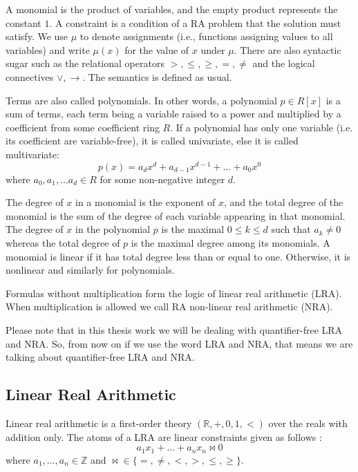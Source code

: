 \noindent A monomial is the product of variables, and the empty product represents the constant $1$. 
A constraint is a condition of a RA problem that the solution must satisfy.
We use $\mu$ to denote assignments (i.e., functions assigning values to all variables) and write $\mu (x)$ for the value of $x$ under $\mu$.
There are also syntactic sugar such as the relational operators $>, \leq, \geq, =, \neq$ and the logical connectives $\vee, \to$.
The semantics is defined as usual.\newline

\noindent Terms are also called polynomials.
In other words, a polynomial $p\in R[x]$ is a sum of terms, each term being a variable raised to a power and multiplied by a coefficient from some coefficient ring $R$.
If a polynomial has only one variable (i.e. its coefficient are variable-free), it is called univariate, else it is called multivariate: 
$$ p(x) = a_{d}x^{d} + a_{d-1}x^{d-1} + \ldots + a_{0}x^{0} $$
where $a_{0}, a_{1}, \ldots a_{d} \in R$ for some non-negative integer $d$.\newline

\noindent The degree of $x$ in a monomial is the exponent of $x$, and the total degree of the monomial is the sum of the degree of each variable appearing in that monomial.
The degree of $x$ in the polynomial $p$ is the maximal $0\leq k\leq d$ such that $a_{k}\neq 0$ whereas the total degree of $p$ is the maximal degree among its monomials.\newline
A monomial is linear if it has total degree less than or equal to one. 
Otherwise, it is nonlinear and similarly for polynomials.\newline

\noindent Formulas without multiplication form the logic of linear real arithmetic (LRA).
When multiplication is allowed we call RA non-linear real arithmetic (NRA).\newline

\noindent Please note that in this thesis work we will be dealing with quantifier-free LRA and NRA.
So, from now on if we use the word LRA and NRA, that means we are talking about quantifier-free LRA and NRA.
\subsection{Linear Real Arithmetic}
\label{subsec:LRA}
Linear real arithmetic is a first-order theory $(\mathbb{R}, +, 0, 1, <)$ over the reals with addition only.
The atoms of a LRA are linear constraints given as follows \cite{LATUM}:
$$ a_{1}x_{1} + \ldots + a_{n}x_{n} \bowtie 0 $$
where $ a_{1}, \ldots, a_{n} \in \mathbb{Z} $ and $ \bowtie \in \{=, \neq, <, >, \leq, \geq \} $.\newline


